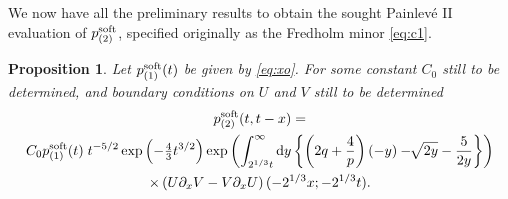 \documentclass[10pt,reqno]{amsart}
\theoremstyle{plain}
\newtheorem{proposition}{Proposition}
\theoremstyle{definition}
\theoremstyle{remark}
\begin{document}
We now have all the preliminary results to obtain the sought Painlev\'e II evaluation of 
$p_{(2)}^{{\rm soft}}$, specified originally as the Fredholm minor \eqref{eq:c1}.

\begin{proposition}
Let $p_{(1)}^{{\rm soft}}(t)$ be given by \eqref{eq:xo}. For some constant $C_0$ still to be determined, 
and boundary conditions on $U$ and $V$ still to be determined
\begin{multline}
  p_{(2)}^{{\rm soft}} (t,t-x) = \\
  C_0  p_{(1)}^{{\rm soft}}(t)\; t^{-5/2} \exp \left( -\tfrac{4}{3}t^{3/2} \right)
		\exp \left( \int_{2^{1/3}t}^{\infty} {\rm d}y \left\{ \left( 2q + \frac{4}{p} \right)(-y)
			-{ \hspace{-0.5pt} \sqrt[]{{2y}}} - \frac{5}{2y} \right\}    \right) 
\\ \times
	\left( U\partial_{x}V-V\partial_{x}U \right)( -2^{1/3}x; -2^{1/3}t). 
\label{eq:ss}
\end{multline}
\end{proposition}
\end{document}
